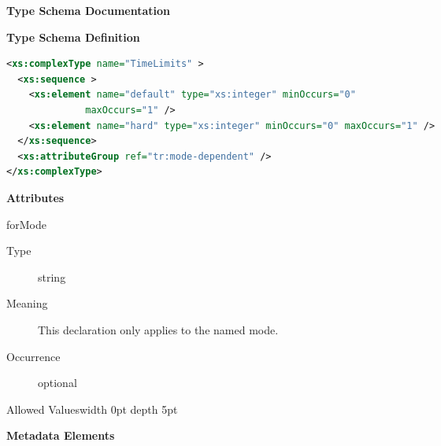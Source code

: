 \documentclass{ivoa}
\begin{document}
\begin{generated}
\begingroup
        \renewcommand*\descriptionlabel[1]{%
        \hbox to 5.5em{\emph{#1}\hfil}}\vspace{2ex}\noindent\textbf{ Type Schema Documentation}


\vspace{1ex}\noindent\textbf{ Type Schema Definition}

\begin{lstlisting}[language=XML,basicstyle=\footnotesize]
<xs:complexType name="TimeLimits" >
  <xs:sequence >
    <xs:element name="default" type="xs:integer" minOccurs="0"
              maxOccurs="1" />
    <xs:element name="hard" type="xs:integer" minOccurs="0" maxOccurs="1" />
  </xs:sequence>
  <xs:attributeGroup ref="tr:mode-dependent" />
</xs:complexType>
\end{lstlisting}

\vspace{0.5ex}\noindent\textbf{ Attributes}

\begingroup\small\begin{bigdescription}\item[forMode]
\begin{description}
\item[Type] string
\item[Meaning] This declaration only applies to the named mode.
\item[Occurrence] optional

\item[Allowed Values\vrule width 0pt depth 5pt]\hfil
\end{description}

\end{bigdescription}\endgroup



\vspace{0.5ex}\noindent\textbf{ Metadata Elements}


\end{generated}
\end{document}
